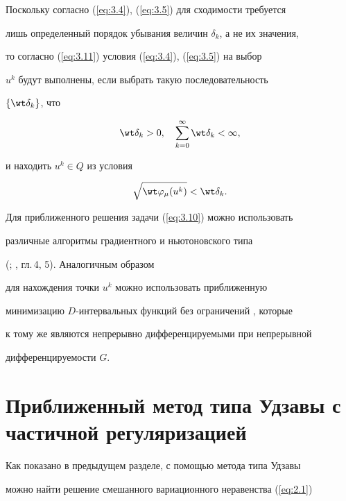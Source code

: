 Поскольку согласно (\ref{eq:3.4}), (\ref{eq:3.5}) для сходимости требуется


лишь определенный порядок убывания величин $\delta_{k}$, а не их значения,


то согласно (\ref{eq:3.11}) условия (\ref{eq:3.4}), (\ref{eq:3.5}) на выбор


$u^{k}$ будут выполнены, если выбрать такую последовательность


$\{\wt \delta_{k} \}$, что 


\begin{equation} \label{eq:3.12} 


\wt \delta_{k} > 0,\quad \sum_{k=0}^{\infty} \wt \delta_{k} < \infty ,


\end{equation}


и находить $u^{k} \in Q$ из условия 


\begin{equation} \label{eq:3.13} 


\sqrt{\wt \varphi_{\mu} (u^{k})} < \wt \delta_{k}. 


\end{equation}


Для приближенного решения задачи (\ref{eq:3.10}) можно использовать


различные алгоритмы градиентного и ньютоновского типа 


(\cite{Pat97}; \cite{Pat99}, гл.\,4, 5). Аналогичным образом 


для нахождения точки $u^{k}$ можно использовать приближенную 


минимизацию $D$-интервальных функций без ограничений \cite{Kon99}, которые 


к тому же являются непрерывно дифференцируемыми при непрерывной 


дифференцируемости $G$.





\section{Приближенный метод типа Удзавы с частичной регуляризацией}





Как показано в предыдущем разделе, с помощью метода типа Удзавы 


можно найти решение смешанного вариационного неравенства (\ref{eq:2.1}) 


